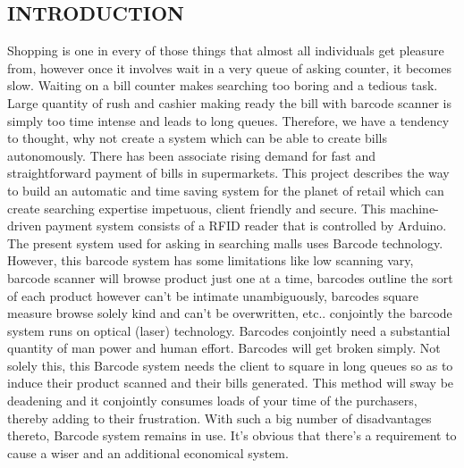 \documentclass[12pt]{article}
\begin{document}
\newpage
{}
\begin{center}
\section{INTRODUCTION}
\end{center}
\hspace*{1cm}Shopping is one in every of those things that almost all individuals get pleasure from, however once it involves wait in a very queue of asking counter, it becomes slow. Waiting on a bill counter makes searching too boring and a tedious task. Large quantity of rush and cashier making ready the bill with barcode scanner is simply too time intense and leads to long queues. Therefore, we have a tendency to thought, why not create a system which can be able to create bills autonomously. There has been associate rising demand for fast and straightforward payment of bills in supermarkets. This project describes the way to build an automatic and time saving system for the planet of retail which can create searching expertise impetuous, client friendly and secure. This machine-driven payment system consists of a RFID reader that is controlled by Arduino.\\
\hspace*{1cm}The present system used for asking in searching malls uses Barcode technology. However, this barcode system has some limitations like low scanning vary, barcode scanner will browse product just one at a time, barcodes outline the sort of each product however can't be intimate unambiguously, barcodes square measure browse solely kind and can't be overwritten, etc.. conjointly the barcode system runs on optical (laser) technology. Barcodes conjointly need a substantial quantity of man power and human effort. Barcodes will get broken simply. Not solely this, this Barcode system needs the client to square in long queues so as to induce their product scanned and their bills generated. This method will sway be deadening and it conjointly consumes loads of your time of the purchasers, thereby adding to their frustration. With such a big number of disadvantages thereto, Barcode system remains in use. It's obvious that there's a requirement to cause a wiser and an additional economical system. \\
\end{document}
